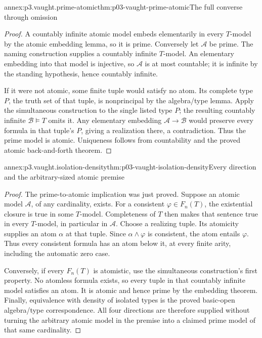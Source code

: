 \begin{annexitem}{annex:p3.vaught.prime-atomic}{thm:p03-vaught-prime-atomic}{The full converse through omission}
\begin{proof}
A countably infinite atomic model embeds elementarily in every
\(T\)-model by the atomic embedding lemma, so it is prime.
Conversely let \(\mathcal A\) be prime. The naming construction supplies
a countably infinite \(T\)-model. An elementary embedding into that
model is injective, so \(\mathcal A\) is at most countable; it is
infinite by the standing hypothesis, hence countably infinite.

If it were not atomic, some finite tuple would satisfy no atom.
Its complete type \(P\), the truth set of that tuple, is nonprincipal
by the algebra/type lemma. Apply the simultaneous construction to
the single listed type \(P\); the resulting countably infinite
\(\mathcal B\models T\) omits it. Any elementary embedding
\(\mathcal A\to\mathcal B\) would preserve every formula in that
tuple's \(P\), giving a realization there, a contradiction.
Thus the prime model is atomic. Uniqueness follows from countability
and the proved atomic back-and-forth theorem.
\end{proof}
\end{annexitem}

\begin{annexitem}{annex:p3.vaught.isolation-density}{thm:p03-vaught-isolation-density}{Every direction and the arbitrary-sized atomic premise}
\begin{proof}
The prime-to-atomic implication was just proved.
Suppose an atomic model \(\mathcal A\), of any cardinality, exists.
For a consistent \(\varphi\in F_n(T)\), the existential closure
is true in some \(T\)-model. Completeness of \(T\) then makes that
sentence true in every \(T\)-model, in particular in \(\mathcal A\).
Choose a realizing tuple. Its atomicity supplies an atom \(\alpha\)
at that tuple. Since \(\alpha\land\varphi\) is consistent, the atom
entails \(\varphi\). Thus every consistent formula has an atom
below it, at every finite arity, including the automatic zero case.

Conversely, if every \(F_n(T)\) is atomistic, use the simultaneous
construction's first property. No atomless formula exists, so every
tuple in that countably infinite model satisfies an atom.
It is atomic and hence prime by the embedding theorem.
Finally, equivalence with density of isolated types is the proved
basic-open algebra/type correspondence. All four directions are
therefore supplied without turning the arbitrary atomic model in
the premise into a claimed prime model of that same cardinality.
\end{proof}
\end{annexitem}

